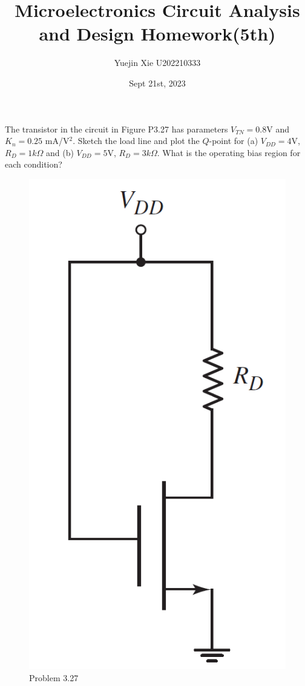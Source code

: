 \documentclass[a4paper,11pt,UTF8]{article}
\title{Microelectronics Circuit Analysis and Design Homework(5th)}
\author{Yuejin Xie \quad U202210333}
\date{Sept 21st, 2023}
\begin{document}
\maketitle
{} The transistor in the circuit in Figure P3.27 has parameters $V_{T N} = 0.8 $V
and $K_n = 0.25$ mA/V$^2$. Sketch the load line and plot the $Q$-point for
(a) $V_{DD} = 4$V, $R_D=1k\Omega$ and (b) $V_{DD} = 5 $V, $R_D=3k\Omega$. What is the
operating bias region for each condition?\\
\begin{figure}[H] 
	\centering 
	\includegraphics[scale=0.18]{MD3.27.png}
	\caption{Problem 3.27}
\end{figure}
\end{document}
